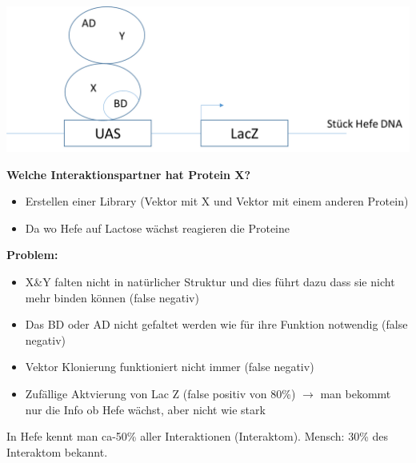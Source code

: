 \includegraphics[width=1\textwidth]{lectures/160429/pix/ppi2.png}

\textbf{Welche Interaktionspartner hat Protein X?}
\begin{itemize}
	\item Erstellen einer Library (Vektor mit X und Vektor mit einem anderen Protein)
	\item Da wo Hefe auf Lactose wächst reagieren die Proteine
\end{itemize}

\textbf{Problem:}
\begin{itemize}
	\item X\&Y falten nicht in natürlicher Struktur und dies führt dazu dass sie nicht mehr binden können (false negativ)
	\item Das BD oder AD nicht gefaltet werden wie für ihre Funktion notwendig (false negativ)
	\item Vektor Klonierung funktioniert nicht immer (false negativ)
	\item Zufällige Aktvierung von Lac Z (false positiv von 80\%) $\rightarrow$ man bekommt nur die Info ob Hefe wächst, aber nicht wie stark
\end{itemize}

In Hefe kennt man ca-50\% aller Interaktionen (Interaktom). Mensch: 30\% des Interaktom bekannt.